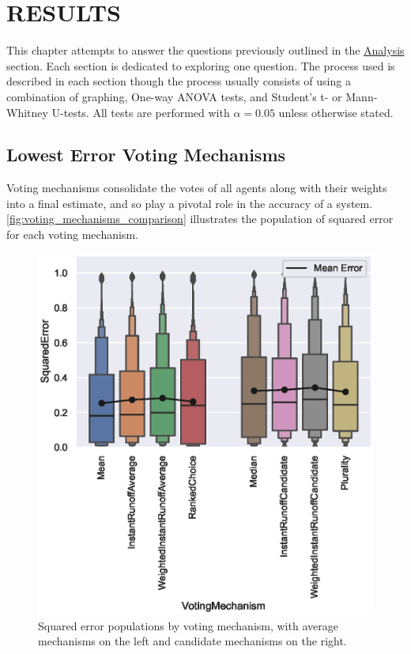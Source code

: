 %
%

\chapter{RESULTS}\label{ch:results}
This chapter attempts to answer the questions previously outlined in the
\hyperref[subsec:analysis]{Analysis} section.
Each section is dedicated to exploring one question.
The process used is described in each section though the process usually
consists of using a combination of graphing, One-way ANOVA tests, and
Student's t- or Mann-Whitney U-tests.
All tests are performed with $\alpha = 0.05$ unless otherwise stated.

\section{Lowest Error Voting Mechanisms}\label{sec:lowest-error-voting-mechanism}
Voting mechanisms consolidate the votes of all agents along with their weights
into a final estimate, and so play a pivotal role in the accuracy of a system.
\autoref{fig:voting_mechanisms_comparison} illustrates the population of
squared error for each voting mechanism.

\begin{figure}[htbp]
    \centering
    \includegraphics[scale=0.75]
    {./content/figures/voting_mechanisms_comparison}
    \caption{Squared error populations by voting mechanism, with average
    mechanisms on the left and candidate mechanisms on the right.}
    \label{fig:voting_mechanisms_comparison}
\end{figure}

